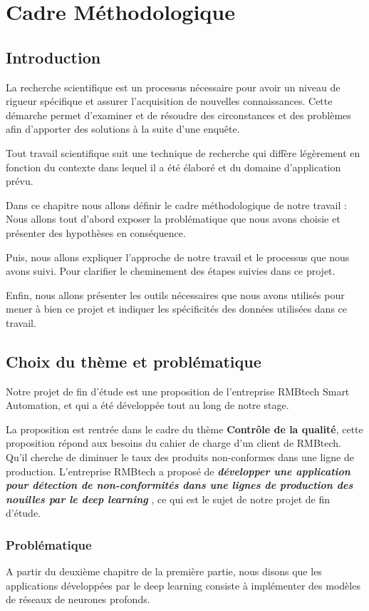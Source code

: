 \chapter{Cadre Méthodologique}
\section{Introduction}
La recherche scientifique est un processus nécessaire pour avoir un niveau de rigueur spécifique et assurer l'acquisition de nouvelles connaissances. Cette démarche permet d'examiner et de résoudre des circonstances et des problèmes afin d'apporter des solutions à la suite d'une enquête. 

Tout travail scientifique suit une technique de recherche qui diffère légèrement en fonction du contexte dans lequel il a été élaboré et du domaine d'application prévu.

Dans ce chapitre nous allons définir le cadre méthodologique de notre travail : Nous allons tout d’abord exposer la problématique que nous avons choisie et présenter des hypothèses en conséquence. 

Puis, nous allons expliquer l'approche de notre travail et le processus que nous avons suivi. Pour clarifier le cheminement des étapes suivies dans ce projet.  

Enfin, nous allons présenter les outils nécessaires que nous avons utilisés pour mener à bien ce projet et indiquer les spécificités des données utilisées dans ce travail.

\section{Choix du thème et problématique}
Notre projet de fin d’étude est une proposition de l'entreprise RMBtech Smart Automation, et qui a été développée tout au long de notre stage. 

La proposition est rentrée dans le cadre du thème \textbf{Contrôle de la qualité}, cette proposition répond aux besoins du cahier de charge d’un client de RMBtech. Qu’il cherche de diminuer le taux des produits non-conformes dans une ligne de production.
L’entreprise RMBtech a proposé de \textbf{\textit{développer une application pour détection de non-conformités dans une lignes de production des nouilles par le deep learning}} , ce qui est le sujet de notre projet de fin d'étude. 
\newpage
\subsection{Problématique}
A partir du deuxième chapitre de la première partie, nous disons que les applications développées par le deep learning consiste à implémenter des modèles de réseaux de neurones profonds.

